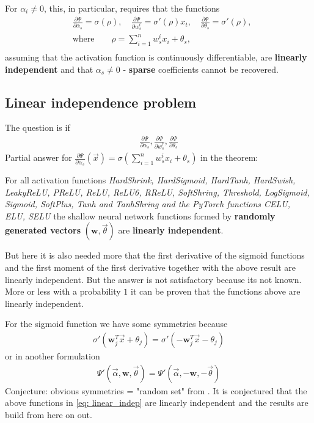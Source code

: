 For $\alpha_i \neq 0$, this, in particular, requires that the functions
\begin{align}
    & \frac{\partial \Psi}{\partial \alpha_s} =\sigma(\rho),\quad
     \frac{\partial \Psi}{\partial w_s^{t}} =\sigma'(\rho)x_t,\quad
     \frac{\partial \Psi}{\partial \theta_s} =\sigma'(\rho),\\
    & \text{where} \qquad
    \rho = \sum_{i=1}^{n}w_s^{i}x_i + \theta_s, \\
\end{align}
assuming that the activation function is continuously differentiable,
are \textbf{linearly independent} and that $\alpha_s \neq 0$ -
\textbf{sparse} coefficients cannot be recovered.
\subsection{Linear independence problem}
The question is if
\begin{align}
    \frac{\partial \Psi}{\partial \alpha_s} ,
    \frac{\partial \Psi}{\partial w_s^{\dagger}} ,
    \frac{\partial \Psi}{\partial \theta_s} \label{eq: linear_indep}
\end{align}
Partial answer for $\frac{\partial \Psi}{\partial \alpha_s} (\vec{x}) =
\sigma\left( \sum_{i=1}^{n} w_s^{i}x_i + \theta_s \right)$ in the
\cite{lamperski_2022} theorem:
\begin{theorem}
    \label{thm: lamperski}
    For all activation functions \textit{HardShrink, HardSigmoid, HardTanh,
    HardSwish, LeakyReLU, PReLU, ReLU, ReLU6, RReLU, SoftShring, Threshold,
    LogSigmoid, Sigmoid, SoftPlus, Tanh and TanhShring and the PyTorch
    functions CELU, ELU, SELU} the shallow neural network functions formed by
    \textbf{randomly generated vectors} $(\mathbf{w}, \vec{\theta})$ are
    \textbf{linearly independent}.
\end{theorem}
But here it is also needed more that the first derivative of the sigmoid functions and
the first moment of the first derivative together with the above result are
linearly independent. But the answer is not satisfactory because its not
known. More or less with a probability $1$ it can be proven that the functions
above are linearly independent.

For the sigmoid function we have some symmetries because
\begin{align}
    \sigma'(\mathbf{w}^{T}_j \vec{x} + \theta_j)
    = \sigma'\left(-\mathbf{w}_j^{T}\vec{x} - \theta_j  \right)
\end{align}
or in another formulation
\begin{align}
    \Psi'(\vec{\alpha}, \mathbf{w}, \vec{\theta}) = \Psi'(\vec{\alpha},
        -\mathbf{w}, -\vec{\theta})
\end{align}
Conjecture: obvious symmetries = "random set" from \cite{lamperski_2022}. It
is conjectured that the above functions in \ref{eq: linear_indep} are
linearly independent and the results are build from here on out.

